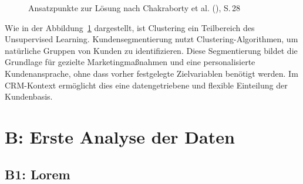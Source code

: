 \documentclass[
  11pt,
  openany, oneside]{book}
\begin{document}
\begin{figure}


\caption{\label{fig-types_of_ml_algorithms}Ansatzpunkte zur Lösung nach
Chakraborty et al.
(),
S.\,28}

\end{figure}%

\noindent Wie in der Abbildung~\ref{fig-types_of_ml_algorithms}
dargestellt, ist Clustering ein Teilbereich des Unsupervised Learning.
Kundensegmentierung nutzt Clustering-Algorithmen, um natürliche Gruppen
von Kunden zu identifizieren. Diese Segmentierung bildet die Grundlage
für gezielte Marketingmaßnahmen und eine personalisierte
Kundenansprache, ohne dass vorher festgelegte Zielvariablen benötigt
werden. Im CRM-Kontext ermöglicht dies eine datengetriebene und flexible
Einteilung der Kundenbasis.

\clearpage

\label{sec-anhangB}
\chapter*{B: Erste Analyse der Daten}\label{b-erste-analyse-der-daten}


\lorem

\label{sec-anhangB1}
\section*{B1: Lorem}\label{b1-lorem}
\end{document}
